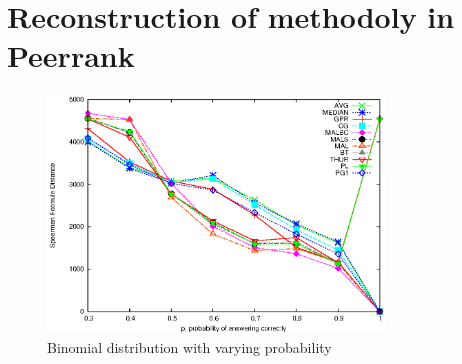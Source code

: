 \documentclass[paper=a4, fontsize=11pt]{scrartcl}	%
\begin{document}
\section{Reconstruction of methodoly in Peerrank}
\begin{figure}[!h]
\centering
\includegraphics[width=0.8\textwidth]{figure1}
\caption{Binomial distribution with varying probability}
\end{figure}
\end{document}
